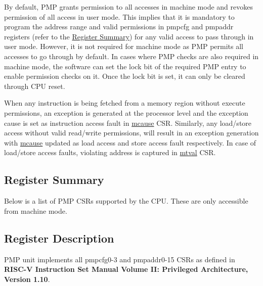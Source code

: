 \documentclass[main\_\_EN.tex]{subfiles}
\begin{document}
By default, PMP grants permission to all accesses in machine mode and revokes permission of all access in user mode. This implies that it is mandatory to program the address range and valid permissions in pmpcfg and pmpaddr registers (refer to the \hyperref[sec:riscvcpu-pmp-reg-summ]{Register Summary}) for any valid access to pass through in user mode. However, it is not required for machine mode as PMP permits all accesses to go through by default. In cases where PMP checks are also required in machine mode, the software can set the lock bit of the required PMP entry to enable permission checks on it. Once the lock bit is set, it can only be cleared through CPU reset.

When any instruction is being fetched from a memory region without execute permissions, an exception is generated at the processor level and the exception cause is set as instruction access fault in \hyperref[regdesc:MCAUSE]{mcause} CSR. Similarly, any load/store access without valid read/write permissions, will result in an exception generation with \hyperref[regdesc:MCAUSE]{mcause} updated as load access and store access fault respectively. In case of load/store access faults, violating address is captured in \hyperref[regdesc:MTVAL]{mtval} CSR.


\clearpage
\hypertarget{riscvcpu-pmp-reg-summ}{}
\subsection{Register Summary}
\label{sec:riscvcpu-pmp-reg-summ}


Below is a list of PMP CSRs supported by the CPU. These are only accessible from machine mode.




\subsection{Register Description}
\label{sec:riscvcpu-pmp-reg-desc}

PMP unit implements all pmpcfg0-3 and pmpaddr0-15 CSRs as defined in \textbf{RISC-V Instruction Set Manual Volume II: Privileged Architecture, Version 1.10}.

\end{document}
